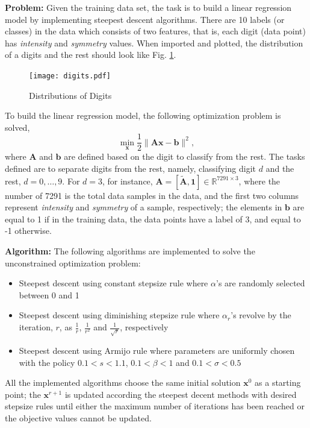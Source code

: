 \documentclass[11pt]{article}
\newcommand\problem{\vspace{.10in}\textbf{Problem: }}
\newcommand\algorithm{\vspace{.10in}\textbf{Algorithm: }}
\begin{document}
\problem Given the training data set, the task is to build a linear regression model by implementing steepest descent algorithms. There are 10 labels (or classes) in the data which consists of two features, that is, each digit (data point) has \emph{intensity} and \emph{symmetry} values. When imported and plotted, the distribution of a digits and the rest should look like Fig. \ref{fig:digits}.
\begin{figure}[!tb]
\centering
\texttt{[image: digits.pdf]}
\caption{Distributions of Digits}
\label{fig:digits}
\end{figure}

To build the linear regression model, the following optimization problem is solved,
\begin{equation*}
\min_\mathbf{x}\frac{1}{2}\|\mathbf{Ax-b}\|^2,
\end{equation*}
where $\mathbf{A}$ and $\mathbf{b}$ are defined based on the digit to classify from the rest. The tasks defined are to separate digits from the rest, namely, classifying digit $d$ and the rest, $d={0,\ldots,9}$. For $d=3$, for instance, $\mathbf{A}=[\tilde{\mathbf{A}},\mathbf{1}]\in\mathbb{R}^{7291\times3}$, where the number of 7291 is the total data samples in the data, and the first two columns represent \emph{intensity} and \emph{symmetry} of a sample, respectively; the elements in $\mathbf{b}$ are equal to 1 if in the training data, the data points have a label of 3, and equal to -1 otherwise.

\algorithm The following algorithms are implemented to solve the unconstrained optimization problem:
\begin{itemize}
  \item Steepest descent using constant stepsize rule where $\alpha$'s are randomly selected between 0 and 1
  \item Steepest descent using diminishing stepsize rule where $\alpha_r$'s revolve by the iteration, $r$, as $\frac{1}{r}$, $\frac{1}{r^2}$ and $\frac{1}{\sqrt{r}}$, respectively
  \item Steepest descent using Armijo rule where parameters are uniformly chosen with the policy $0.1<s<1.1$, $0.1<\beta<1$ and $0.1<\sigma<0.5$
\end{itemize}

All the implemented algorithms choose the same initial solution $\mathbf{x}^0$ as a starting point; the $\mathbf{x}^{r+1}$ is updated according the steepest decent methods with desired stepsize rules until either the maximum number of iterations has been reached or the objective values cannot be updated.
\end{document}
